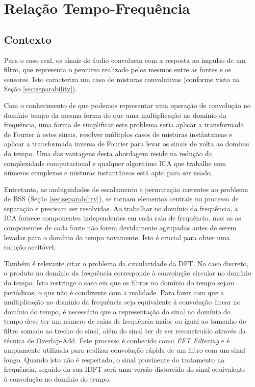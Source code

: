 \label{chap:3}

\section{Relação Tempo-Frequência}
    
    \subsection{Contexto}
        Para o caso real, os sinais de áudio convoluem com a resposta ao impulso de um filtro, que representa o percurso realizado pelos mesmos entre as fontes e os sensores. Isto caracteriza um caso de misturas convolutivas (conforme visto na Seção \ref{sec:separability}). 
        
        Com o conhecimento de que podemos representar uma operação de convolução no domínio tempo da mesma forma do que uma multiplicação no domínio da frequência, uma forma de simplificar este problema seria aplicar a transformada de Fourier à estes sinais, resolver múltiplos casos de misturas instântaneas e aplicar a transformada inversa de Fourier para levar os sinais de volta ao domínio do tempo. Uma das vantagens desta abordagem reside na redução da complexidade computacional e qualquer algoritimo ICA que trabalhe com números complexos e misturas instantâneas está apto para ser usado.
        
        Entretanto, as ambiguidades de escalamento e permutação inerentes ao problema de BSS (Seção \ref{sec:separability}), se tornam elementos centrais no processo de separação e precisam ser resolvidas. Ao trabalhar no domínio da frequência, a ICA fornece componentes independentes em cada raia de frequência, mas as as componentes de cada fonte não forem devidamente agrupadas antes de serem levadas para o domínio do tempo novamente. Isto é crucial para obter uma solução aceitável.
        
        Também é relevante citar o problema da circularidade da DFT. No caso discreto, o produto no domínio da frequência corresponde à convolução circular no domínio do tempo. Isto restringe o caso em que os filtros no domínio do tempo sejam periódicos, o que não é condizente com a realidade. Para fazer com que a multiplicação no domínio da frequência seja equivalente à convolução linear no domínio do tempo, é necessário que a representação do sinal no domínio do tempo deve ter um número de raias de frequência maior ou igual ao tamanho do filtro somado ao trecho do sinal, além do sinal ter de ser reconstruído através da técnica de Overlap-Add. Este processo é conhecido como \textit{FFT Filtering} e é amplamente utilizada para realizar convolução rápida de um filtro com um sinal longo. Quando isto não é respeitado, o sinal provinente do tratamento na frequência, seguido da sua IDFT será uma versão distorcida do sinal equivalente à convolução no domínio do tempo.
    
